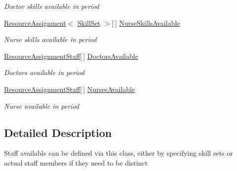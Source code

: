 \begin{DoxyCompactItemize}
\begin{DoxyCompactList}\small\item\em Doctor skills available in period \end{DoxyCompactList}\item 
\hyperlink{class_general_health_care_elements_1_1_resource_handling_1_1_resource_assignment}{Resource\+Assignment}$<$ \hyperlink{class_simulation_core_1_1_h_c_c_m_elements_1_1_skill_set}{Skill\+Set} $>$\mbox{[}$\,$\mbox{]} \hyperlink{class_general_health_care_elements_1_1_staff_handling_1_1_staff_availability_period_a7af6961c08ad43f43f9e38906cf3ab3f}{Nurse\+Skills\+Available}
\begin{DoxyCompactList}\small\item\em Nurse skills available in period \end{DoxyCompactList}\item 
\hyperlink{class_general_health_care_elements_1_1_resource_handling_1_1_resource_assignment_staff}{Resource\+Assignment\+Staff}\mbox{[}$\,$\mbox{]} \hyperlink{class_general_health_care_elements_1_1_staff_handling_1_1_staff_availability_period_a060c91477835dd0895607ee354c2b2fd}{Doctors\+Available}
\begin{DoxyCompactList}\small\item\em Doctors available in period \end{DoxyCompactList}\item 
\hyperlink{class_general_health_care_elements_1_1_resource_handling_1_1_resource_assignment_staff}{Resource\+Assignment\+Staff}\mbox{[}$\,$\mbox{]} \hyperlink{class_general_health_care_elements_1_1_staff_handling_1_1_staff_availability_period_aae6c7fec2ee41e1ac60dfcba65eb9470}{Nurses\+Available}
\begin{DoxyCompactList}\small\item\em Nurse available in period \end{DoxyCompactList}\end{DoxyCompactItemize}


\subsection{Detailed Description}
Staff available can be defined via this class, either by specifying skill sets or actual staff members if they need to be distinct 



